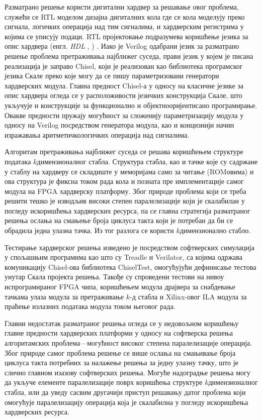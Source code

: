 \documentclass[master]{finthesis}
\makeatletter
\newcommand*{\engl}[2][\@empty]{%
    \edef\theacronym{#1}%
    (енгл. \foreignlanguage{english}{\emph{#2}%
    \ifx\theacronym\@empty \else , #1\fi})%
}
\newcommand*{\kdim}[1]{\texorpdfstring{$k$\Hyphdash}{k-}димензионал#1}
\newcommand*{\kd}{\texorpdfstring{$k$}{k}-д }
\makeatother
\begin{document}
Разматрано решење користи дигитални хардвер за решавање овог проблема, служећи се RTL моделом дизајна дигиталних кола где се кола моделују преко сигнала, логичких операција над тим сигналима, и хардверским регистрима у којима се уписују подаци. RTL пројектовање подразумева коришћење језика за опис хардвера \engl{\normalfont HDL}. Иако је Verilog одабрани језик за разматрано решење проблема претраживања најближег суседа, прави језик у којем је писана реализација је заправо Chisel, који је реализован као библиотека програмског језика Скале преко које могу да се пишу параметризовани генератори хардверских модула. Главна предност Chisel-а у односу на класичне језике за опис хардвера огледа се у расположивости језичких конструкција Скале, што укључује и конструкције за функционално и објектно\Hyphdash оријентисано програмирање. Овакве предности пружају могућност за сложенију параметризацију модула у односу на Verilog посредством генератора модула, као и концизнији начин изражавања аритметичко\Hyphdash логичких операција над сигналима.

Алгоритам претраживања најближег суседа се решава коришћењем структуре података \kdim{ног} стабла. Структура стабла, као и тачке које су садржане у стаблу на хардверу се складиште у меморијама само за читање (ROM\Hyphdash овима) и ова структура је фиксна током рада кола и позната пре имплементације самог модула на FPGA хардверску платформу. Због природе проблема који се треба решити тешко је изводљив високи степен паралелизације који је скалабилан у погледу искоришћења хардверских ресурса, па се главна стратегија разматраног решења ослања на смањење броја циклуса такта који је потребан да би се обрадила једна улазна тачка. Из тог разлога се користи \kdim{но} стабло.

Тестирање хардверског решења изведено је посредством софтверских симулација у спољашњим програмима као што су Treadle и Verilator, са којима одржава комуникацију Chisel-ова библиотека ChiselTest, омогућујући дефинисање тестова унутар Скала пројекта решења. Такође су спроведени тестови на нивоу испрограмираног FPGA чипа, коришћењем модула драјвера за снабдевање тачкама улаза модула за претраживање \kd стабла и Xilinx-овог ILA модула за праћење излазних података модула током његовог рада.

Главни недостатак разматраног решења огледа се у недовољном коришћењу главне предности хардверских платформи у односу на софтверска решења алгоритамских проблема---могућност високог степена паралелизације операција. Због природе самог проблема решење се више ослања на смањивање броја циклуса такта потребних за налажење решења за једну улазну тачку, што је слично главном изазову софтверских решења. Могуће надоградње решења могу да укључе елементе паралелизације поврх коришћења структуре \kdim{ног} стабла, или да уведу сасвим другачији приступ решавању датог проблема који омогућује паралелизацију операција која је скалабилна у погледу искоришћења хардверских ресурса.
\end{document}
